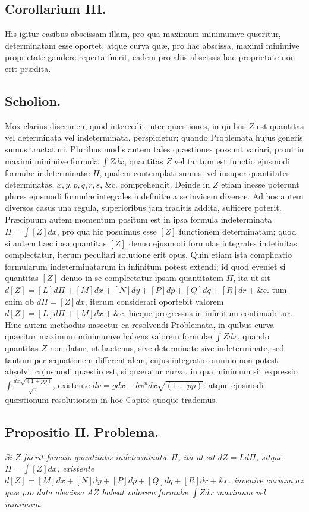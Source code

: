 \subsection*{Corollarium III.}
His igitur casibus abscissam illam, pro qua maximum minimumve quæritur, determinatam esse oportet, atque curva quæ, pro hac abscissa, maximi minimive proprietate gaudere reperta fuerit, eadem pro aliis abscissis hac proprietate non erit prædita.
\subsection*{Scholion.}
Mox clarius discrimen, quod intercedit inter quæstiones, in quibus $Z$ est quantitas vel determinata vel indeterminata, perspicietur; quando Problemata hujus generis sumus tractaturi. Pluribus modis autem tales quæstiones possunt variari, prout in maximi minimive formula $\int Zdx$, quantitas $Z$ vel tantum est functio ejusmodi formulæ indeterminatæ $\Pi$, qualem contemplati sumus, vel insuper quantitates determinatas, $x,y,p,q,r,s$, \&c. comprehendit. Deinde in $Z$ etiam inesse poterunt plures ejusmodi formulæ integrales indefinitæ a se invicem diversæ. Ad hos autem diversos casus una regula, superioribus jam traditis addita, sufficere poterit. Præcipuum autem momentum positum est in ipsa formula indeterminata $\Pi=\int[Z]dx$, pro qua hic posuimus esse $[Z]$ functionem determinatam; quod si autem hæc ipsa quantitas $[Z]$ denuo ejusmodi formulas integrales indefinitas complectatur, iterum peculiari solutione erit opus. Quin etiam ista complicatio formularum indeterminatarum in infinitum potest extendi; id quod eveniet si quantitas $[Z]$ denuo in se complectatur ipsam quantitatem $\Pi$, ita ut sit $d[Z]=[L]d\Pi+[M]dx+[N]dy+[P]dp+[Q]dq+[R]dr+\text{\&c.}$ tum enim ob $d\Pi=[Z]dx$, iterum considerari oportebit valorem $d[Z]=[L]d\Pi+[M]dx+\text{\&c.}$ hicque progressus in infinitum continuabitur. Hinc autem methodus nascetur ea resolvendi Problemata, in quibus curva quæritur maximum minimumve habens valorem formulæ $\int Zdx$, quando quantitas $Z$ non datur,
ut hactenus, sive determinate sive indeterminate, sed tantum per æquationem differentialem, cujus integratio omnino non potest absolvi: cujusmodi quæstio est, si quæratur curva, in qua minimum sit expressio $\int\frac{dx\sqrt{(1+pp)}}{\sqrt v}$, existente $dv=gdx-hv^n dx\sqrt{(1+pp)}$: atque ejusmodi quæstionum resolutionem in hoc Capite quoque trademus.
\subsection*{Propositio II. Problema.}
\textit{Si $Z$ fuerit functio quantitatis indeterminatæ $\Pi$, ita ut sit $dZ=Ld\Pi$, sitque $\Pi=\int[Z]dx$, existente $d[Z]=[M]dx+[N]dy+[P]dp+[Q]dq+[R]dr+\text{\&c.}$ invenire curvam $az$ quæ pro data abscissa $AZ$ habeat valorem formulæ $\int Zdx$ maximum vel minimum.}
